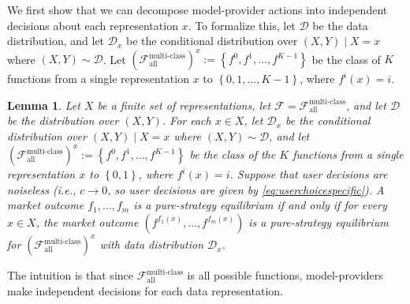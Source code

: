 \documentclass[letterpaper,11pt]{article}
\newtheorem{lemma}{Lemma}
\theoremstyle{plain}
\begin{document}
We first show that we can decompose model-provider actions into independent decisions about each representation $x$. To formalize this, let $\mathcal{D}$ be the data distribution, and let $\mathcal{D}_x$ be the conditional distribution over $(X,Y) \mid X = x$ where $(X,Y) \sim \mathcal{D}$. Let $(\mathcal{F}^{\text{multi-class}}_{\text{all}})^x := \left\{f^0, f^1, \ldots, f^{K-1}\right\}$ be the class of $K$ functions from a single representation $x$ to $\left\{0,1, \ldots, K-1 \right\}$, where $f^i(x) = i$. 
\begin{lemma}
\label{lemma:decomposition}
Let $X$ be a finite set of representations, let $\mathcal{F} = \mathcal{F}^{\text{multi-class}}_{\text{all}}$, and let $\mathcal{D}$ be the distribution over $(X,Y)$. For each $x \in X$, let $\mathcal{D}_x$ be the conditional distribution over $(X,Y) \mid X = x$ where $(X,Y) \sim \mathcal{D}$, and let $(\mathcal{F}^{\text{multi-class}}_{\text{all}})^x := \left\{f^0, f^1, \ldots, f^{K-1} \right\}$ be the class of the $K$ functions from a single representation $x$ to $\left\{0,1\right\}$, where $f^i(x) = i$. Suppose that user decisions are noiseless (i.e., $c \rightarrow 0$, so user decisions are given by \eqref{eq:userchoicespecific}). A market outcome $f_1, \ldots, f_m$ is a pure-strategy equilibrium if and only if for every $x \in X$, the market outcome $(f^{f_1(x)}, \ldots, f^{f_m(x)})$ is a pure-strategy equilibrium for $(\mathcal{F}^{\text{multi-class}}_{\text{all}})^x$ with data distribution $\mathcal{D}_x$.
\end{lemma}
The intuition is that since $\mathcal{F}^{\text{multi-class}}_{\text{all}}$ is all possible functions, model-providers make independent decisions for each data representation. 
\end{document}
